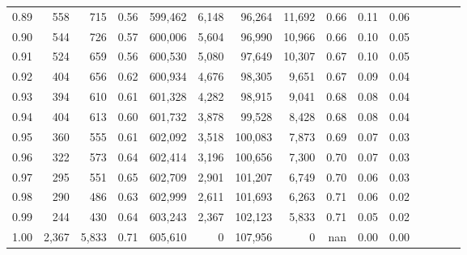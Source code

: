 \begin{tabular}{rrrcrrrrrrrrrrr}
0.89 &     558 &    715 &                                       0.56 &  599,462 &    6,148 &   96,264 &   11,692 &  0.66 &  0.11 &                         0.06 \\
0.90 &     544 &    726 &                                       0.57 &  600,006 &    5,604 &   96,990 &   10,966 &  0.66 &  0.10 &                         0.05 \\
0.91 &     524 &    659 &                                       0.56 &  600,530 &    5,080 &   97,649 &   10,307 &  0.67 &  0.10 &                         0.05 \\
0.92 &     404 &    656 &                                       0.62 &  600,934 &    4,676 &   98,305 &    9,651 &  0.67 &  0.09 &                         0.04 \\
0.93 &     394 &    610 &                                       0.61 &  601,328 &    4,282 &   98,915 &    9,041 &  0.68 &  0.08 &                         0.04 \\
0.94 &     404 &    613 &                                       0.60 &  601,732 &    3,878 &   99,528 &    8,428 &  0.68 &  0.08 &                         0.04 \\
0.95 &     360 &    555 &                                       0.61 &  602,092 &    3,518 &  100,083 &    7,873 &  0.69 &  0.07 &                         0.03 \\
0.96 &     322 &    573 &                                       0.64 &  602,414 &    3,196 &  100,656 &    7,300 &  0.70 &  0.07 &                         0.03 \\
0.97 &     295 &    551 &                                       0.65 &  602,709 &    2,901 &  101,207 &    6,749 &  0.70 &  0.06 &                         0.03 \\
0.98 &     290 &    486 &                                       0.63 &  602,999 &    2,611 &  101,693 &    6,263 &  0.71 &  0.06 &                         0.02 \\
0.99 &     244 &    430 &                                       0.64 &  603,243 &    2,367 &  102,123 &    5,833 &  0.71 &  0.05 &                         0.02 \\
1.00 &   2,367 &  5,833 &                                       0.71 &  605,610 &        0 &  107,956 &        0 &   nan &  0.00 &                         0.00 \\
\bottomrule
\end{tabular}
